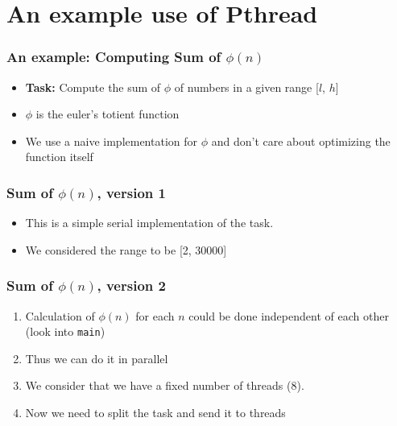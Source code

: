 \documentclass[aspectratio=43,11pt]{beamer}
\newenvironment{changemargin}[1]{%
  \begin{list}{}{%
    \setlength{\topsep}{0pt}%
    \setlength{\leftmargin}{#1}%
    \setlength{\rightmargin}{1em}
    \setlength{\listparindent}{\parindent}%
    \setlength{\itemindent}{\parindent}%
    \setlength{\parsep}{\parskip}%
  }%
  \item[]}{\end{list}}
\begin{document}
\section{An example use of Pthread}
\begin{frame}
  \sectionpage
\end{frame}
\begin{frame}
  \frametitle{An example: Computing Sum of $\phi(n)$}
  
  \begin{itemize}
    \item \textbf{Task:} Compute the sum of $\phi$ of numbers in a given range [$l$, $h$]
    \item $\phi$ is the euler's totient function
    \item We use a naive implementation for $\phi$ and don't care about optimizing the function itself
  \end{itemize}
\end{frame}
\begin{frame}
  \frametitle{Sum of $\phi(n)$, version 1}
  
  \begin{itemize}
    \item This is a simple serial implementation of the task.
    \item We considered the range to be [2, 30000]
  \end{itemize}
  
  \begin{changemargin}{0.5cm}
  
  \end{changemargin}
  \let\thefootnote\relax{}
\end{frame}
\begin{frame}
  \frametitle{Sum of $\phi(n)$, version 2}

  \begin{enumerate}
    \item Calculation of $\phi(n)$ for each $n$ could be done independent of each other (look into {\tt main})
    \item Thus we can do it in parallel
    \item We consider that we have a fixed number of threads (8).
    \item Now we need to split the task and send it to threads
  \end{enumerate}  
\end{frame}
\end{document}
